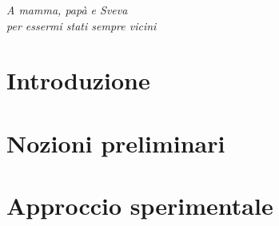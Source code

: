 \documentclass[a4paper,12pt]{book}
\begin{document}

\thispagestyle{empty} %
\cleardoublepage

\clearpage{\pagestyle{plain}\cleardoublepage}
\vspace*{\fill}
\begin{flushright}
\textit{A mamma, papà e Sveva\\per essermi stati sempre vicini}
\end{flushright}
\vspace*{\fill}

\thispagestyle{empty}

\clearpage{\pagestyle{plain}\cleardoublepage}
\tableofcontents %

\clearpage{\pagestyle{plain}\cleardoublepage} %

\clearpage{\pagestyle{plain}\cleardoublepage} %
\chapter*{Introduzione} %
\label{chapter:zero} %

\clearpage{\pagestyle{plain}\cleardoublepage} %
\chapter{Nozioni preliminari} %
\label{chapter:primo} %

\clearpage{\pagestyle{plain}\cleardoublepage} %
\chapter{Approccio sperimentale} %
\label{chapter:secondo} %

\clearpage{\pagestyle{plain}\cleardoublepage} %
\end{document}
